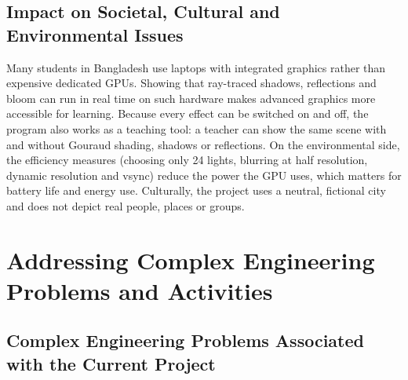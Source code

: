 \documentclass[12pt, a4paper]{report}
\begin{document}
\section{Impact on Societal, Cultural and Environmental Issues}

\begin{justify}
  {\fontsize{12}{13.8}\selectfont
    Many students in Bangladesh use laptops with integrated graphics rather than expensive dedicated GPUs. Showing that ray-traced shadows, reflections and bloom can run in real time on such hardware makes advanced graphics more accessible for learning. Because every effect can be switched on and off, the program also works as a teaching tool: a teacher can show the same scene with and without Gouraud shading, shadows or reflections. On the environmental side, the efficiency measures (choosing only 24 lights, blurring at half resolution, dynamic resolution and vsync) reduce the power the GPU uses, which matters for battery life and energy use. Culturally, the project uses a neutral, fictional city and does not depict real people, places or groups.
  }
\end{justify}

\chapter{Addressing Complex Engineering Problems and Activities}

\section{Complex Engineering Problems Associated with the Current Project}
\end{document}
